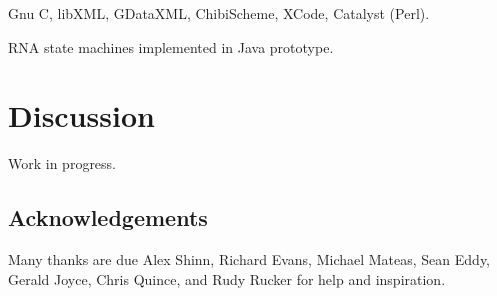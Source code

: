 \documentclass{acm_proc_article-sp}
\begin{document}
Gnu C, libXML, GDataXML, ChibiScheme, XCode, Catalyst (Perl).

RNA state machines implemented in Java prototype.

\section{Discussion}

Work in progress.

\subsection{Acknowledgements}

Many thanks are due Alex Shinn, Richard Evans, Michael Mateas, Sean Eddy, Gerald Joyce, Chris Quince,
and Rudy Rucker for help and inspiration.




\balancecolumns
\end{document}
